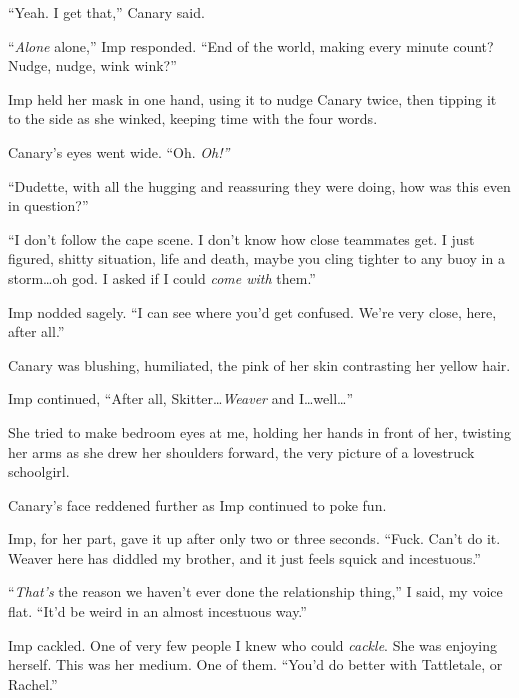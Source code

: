 ``Yeah.  I get that,'' Canary said.



``\emph{Alone} alone,'' Imp responded.  ``End of the world, making every minute count?  Nudge, nudge, wink wink?''



Imp held her mask in one hand, using it to nudge Canary twice, then tipping it to the side as she winked, keeping time with the four words.



Canary's eyes went wide.  ``Oh.  \emph{Oh!''}



``Dudette, with all the hugging and reassuring they were doing, how was this even in question?''



``I don't follow the cape scene.  I don't know how close teammates get.  I just figured, shitty situation, life and death, maybe you cling tighter to any buoy in a storm\ldots oh god.  I asked if I could \emph{come with} them.''



Imp nodded sagely.  ``I can see where you'd get confused.  We're very close, here, after all.''



Canary was blushing, humiliated, the pink of her skin contrasting her yellow hair.



Imp continued, ``After all, Skitter\ldots \emph{Weaver} and I\ldots well\ldots''



She tried to make bedroom eyes at me, holding her hands in front of her, twisting her arms as she drew her shoulders forward, the very picture of a lovestruck schoolgirl.



Canary's face reddened further as Imp continued to poke fun.



Imp, for her part, gave it up after only two or three seconds.  ``Fuck.  Can't do it.  Weaver here has diddled my brother, and it just feels squick and incestuous.''



``\emph{That's }the reason we haven't ever done the relationship thing,'' I said, my voice flat.  ``It'd be weird in an almost incestuous way.''



Imp cackled.  One of very few people I knew who could \emph{cackle}.  She was enjoying herself.  This was her medium.  One of them.  ``You'd do better with Tattletale, or Rachel.''



